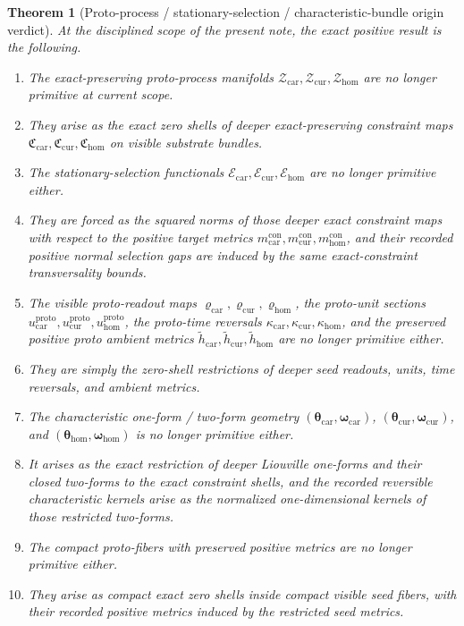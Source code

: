 \documentclass[11pt]{article}
\newcommand{\TensorProtoSpace}{\mathcal Z_{\mathrm{car}}}
\newcommand{\CurProtoSpace}{\mathcal Z_{\mathrm{cur}}}
\newcommand{\HomProtoSpace}{\mathcal Z_{\mathrm{hom}}}
\newcommand{\TensorProtoRead}{\varrho_{\mathrm{car}}}
\newcommand{\CurProtoRead}{\varrho_{\mathrm{cur}}}
\newcommand{\HomProtoRead}{\varrho_{\mathrm{hom}}}
\newcommand{\TensorProtoUnit}{u_{\mathrm{car}}^{\mathrm{proto}}}
\newcommand{\CurProtoUnit}{u_{\mathrm{cur}}^{\mathrm{proto}}}
\newcommand{\HomProtoUnit}{u_{\mathrm{hom}}^{\mathrm{proto}}}
\newcommand{\TensorProtoTimeRev}{\kappa_{\mathrm{car}}}
\newcommand{\CurProtoTimeRev}{\kappa_{\mathrm{cur}}}
\newcommand{\HomProtoTimeRev}{\kappa_{\mathrm{hom}}}
\newcommand{\TensorProtoAmbientMetric}{\widetilde h_{\mathrm{car}}}
\newcommand{\CurProtoAmbientMetric}{\widetilde h_{\mathrm{cur}}}
\newcommand{\HomProtoAmbientMetric}{\widetilde h_{\mathrm{hom}}}
\newcommand{\TensorSelection}{\mathscr E_{\mathrm{car}}}
\newcommand{\CurSelection}{\mathscr E_{\mathrm{cur}}}
\newcommand{\HomSelection}{\mathscr E_{\mathrm{hom}}}
\newcommand{\TensorCharForm}{\boldsymbol{\theta}_{\mathrm{car}}}
\newcommand{\CurCharForm}{\boldsymbol{\theta}_{\mathrm{cur}}}
\newcommand{\HomCharForm}{\boldsymbol{\theta}_{\mathrm{hom}}}
\newcommand{\TensorCharTwo}{\boldsymbol{\omega}_{\mathrm{car}}}
\newcommand{\CurCharTwo}{\boldsymbol{\omega}_{\mathrm{cur}}}
\newcommand{\HomCharTwo}{\boldsymbol{\omega}_{\mathrm{hom}}}
\newcommand{\TensorConstraintMetric}{m_{\mathrm{car}}^{\mathrm{con}}}
\newcommand{\CurConstraintMetric}{m_{\mathrm{cur}}^{\mathrm{con}}}
\newcommand{\HomConstraintMetric}{m_{\mathrm{hom}}^{\mathrm{con}}}
\newcommand{\TensorConstraintMap}{\mathfrak C_{\mathrm{car}}}
\newcommand{\CurConstraintMap}{\mathfrak C_{\mathrm{cur}}}
\newcommand{\HomConstraintMap}{\mathfrak C_{\mathrm{hom}}}
\newtheorem{theorem}{Theorem}
\begin{document}
\begin{theorem}[Proto-process / stationary-selection / characteristic-bundle origin verdict]
\label{thm:verdict}
At the disciplined scope of the present note, the exact positive result is the following.
\begin{enumerate}
    \item The exact-preserving proto-process manifolds \(\TensorProtoSpace,\CurProtoSpace,\HomProtoSpace\) are no longer primitive at current scope.
    \item They arise as the exact zero shells of deeper exact-preserving constraint maps \(\TensorConstraintMap,\CurConstraintMap,\HomConstraintMap\) on visible substrate bundles.
    \item The stationary-selection functionals \(\TensorSelection,\CurSelection,\HomSelection\) are no longer primitive either.
    \item They are forced as the squared norms of those deeper exact constraint maps with respect to the positive target metrics \(\TensorConstraintMetric,\CurConstraintMetric,\HomConstraintMetric\), and their recorded positive normal selection gaps are induced by the same exact-constraint transversality bounds.
    \item The visible proto-readout maps \(\TensorProtoRead,\CurProtoRead,\HomProtoRead\), the proto-unit sections \(\TensorProtoUnit,\CurProtoUnit,\HomProtoUnit\), the proto-time reversals \(\TensorProtoTimeRev,\CurProtoTimeRev,\HomProtoTimeRev\), and the preserved positive proto ambient metrics \(\TensorProtoAmbientMetric,\CurProtoAmbientMetric,\HomProtoAmbientMetric\) are no longer primitive either.
    \item They are simply the zero-shell restrictions of deeper seed readouts, units, time reversals, and ambient metrics.
    \item The characteristic one-form / two-form geometry \((\TensorCharForm,\TensorCharTwo)\), \((\CurCharForm,\CurCharTwo)\), and \((\HomCharForm,\HomCharTwo)\) is no longer primitive either.
    \item It arises as the exact restriction of deeper Liouville one-forms and their closed two-forms to the exact constraint shells, and the recorded reversible characteristic kernels arise as the normalized one-dimensional kernels of those restricted two-forms.
    \item The compact proto-fibers with preserved positive metrics are no longer primitive either.
    \item They arise as compact exact zero shells inside compact visible seed fibers, with their recorded positive metrics induced by the restricted seed metrics.

\end{enumerate}
\end{theorem}
\end{document}
